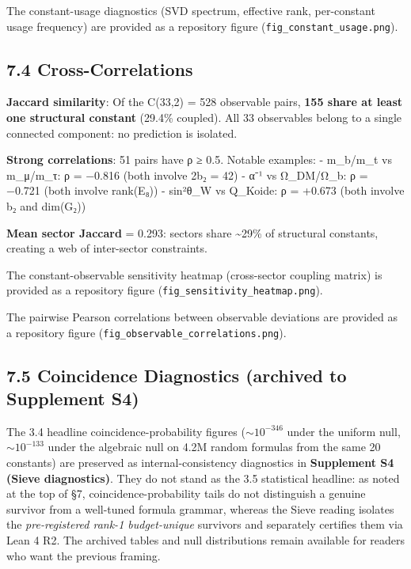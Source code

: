 \documentclass[11pt,a4paper]{article}
\begin{document}
The constant-usage diagnostics (SVD spectrum, effective rank, per-constant usage frequency) are provided as a repository figure (\texttt{fig\_\allowbreak{}constant\_\allowbreak{}usage.\allowbreak{}png}).

\subsection{7.4 Cross-Correlations}\label{cross-correlations}

\textbf{Jaccard similarity}: Of the C(33,2) = 528 observable pairs, \textbf{155 share at least one structural constant} (29.4\% coupled). All 33 observables belong to a single connected component: no prediction is isolated.

\textbf{Strong correlations}: 51 pairs have \textbar ρ\textbar{} ≥ 0.5. Notable examples: - m\_\allowbreak{}b/m\_\allowbreak{}t vs m\_\allowbreak{}μ/m\_\allowbreak{}τ: ρ = −0.816 (both involve 2b₂ = 42) - α⁻¹ vs Ω\_\allowbreak{}DM/Ω\_\allowbreak{}b: ρ = −0.721 (both involve rank(E₈)) - sin²θ\_\allowbreak{}W vs Q\_\allowbreak{}Koide: ρ = +0.673 (both involve b₂ and dim(G₂))

\textbf{Mean sector Jaccard} = 0.293: sectors share \textasciitilde29\% of structural constants, creating a web of inter-sector constraints.

The constant-observable sensitivity heatmap (cross-sector coupling matrix) is provided as a repository figure (\texttt{fig\_\allowbreak{}sensitivity\_\allowbreak{}heatmap.\allowbreak{}png}).

The pairwise Pearson correlations between observable deviations are provided as a repository figure (\texttt{fig\_\allowbreak{}observable\_\allowbreak{}correlations.\allowbreak{}png}).

\subsection{7.5 Coincidence Diagnostics (archived to Supplement S4)}\label{coincidence-diagnostics-archived-to-supplement-s4}

The 3.4 headline coincidence-probability figures (\(\sim 10^{-346}\) under the uniform null, \(\sim 10^{-133}\) under the algebraic null on 4.2M random formulas from the same 20 constants) are preserved as internal-consistency diagnostics in \textbf{Supplement S4 (Sieve diagnostics)}. They do not stand as the 3.5 statistical headline: as noted at the top of §7, coincidence-probability tails do not distinguish a genuine survivor from a well-tuned formula grammar, whereas the Sieve reading isolates the \emph{pre-registered rank-1 budget-unique} survivors and separately certifies them via Lean 4 R2. The archived tables and null distributions remain available for readers who want the previous framing.
\end{document}
